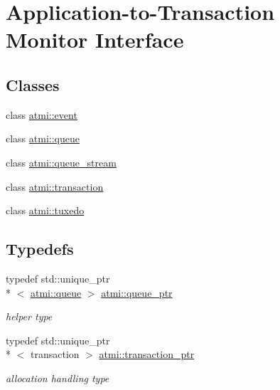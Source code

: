 \hypertarget{group__atmi}{\section{Application-\/to-\/\+Transaction Monitor Interface}
\label{group__atmi}
}
\subsection*{Classes}
\begin{DoxyCompactItemize}
\item 
class \hyperlink{classatmi_1_1event}{atmi\+::event}
\item 
class \hyperlink{classatmi_1_1queue}{atmi\+::queue}
\item 
class \hyperlink{classatmi_1_1queue__stream}{atmi\+::queue\+\_\+stream}
\item 
class \hyperlink{classatmi_1_1transaction}{atmi\+::transaction}
\item 
class \hyperlink{classatmi_1_1tuxedo}{atmi\+::tuxedo}
\end{DoxyCompactItemize}
\subsection*{Typedefs}
\begin{DoxyCompactItemize}
\item 
\hypertarget{group__atmi_ga7cfd5961e0e05b148f12be311177a1a8}{typedef std\+::unique\+\_\+ptr\\*
$<$ \hyperlink{classatmi_1_1queue}{atmi\+::queue} $>$ \hyperlink{group__atmi_ga7cfd5961e0e05b148f12be311177a1a8}{atmi\+::queue\+\_\+ptr}}\label{group__atmi_ga7cfd5961e0e05b148f12be311177a1a8}

\begin{DoxyCompactList}\small\item\em helper type \end{DoxyCompactList}\item 
\hypertarget{group__atmi_gab8e359f2305eaf285b0b0745d3b41997}{typedef std\+::unique\+\_\+ptr\\*
$<$ transaction $>$ \hyperlink{group__atmi_gab8e359f2305eaf285b0b0745d3b41997}{atmi\+::transaction\+\_\+ptr}}\label{group__atmi_gab8e359f2305eaf285b0b0745d3b41997}

\begin{DoxyCompactList}\small\item\em allocation handling type \end{DoxyCompactList}\end{DoxyCompactItemize}
